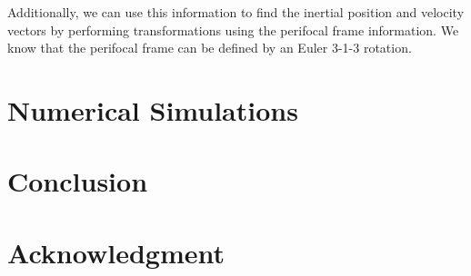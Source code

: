 \documentclass[paper]{aiaaNew}
\begin{document}
Additionally, we can use this information to find the inertial position and velocity vectors by performing transformations using the perifocal frame information. We know that the perifocal frame can be defined by an Euler 3-1-3 rotation.  









\section{Numerical Simulations}

\section{Conclusion}

\section*{Acknowledgment}

\end{document}
